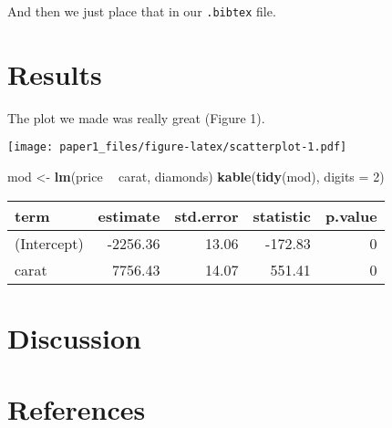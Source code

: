 \documentclass[
]{article}
\newenvironment{Shaded}{\begin{snugshade}}{\end{snugshade}}
\newcommand{\DataTypeTok}[1]{\textcolor[rgb]{0.13,0.29,0.53}{#1}}
\newcommand{\DecValTok}[1]{\textcolor[rgb]{0.00,0.00,0.81}{#1}}
\newcommand{\KeywordTok}[1]{\textcolor[rgb]{0.13,0.29,0.53}{\textbf{#1}}}
\newcommand{\NormalTok}[1]{#1}
\newcommand{\OperatorTok}[1]{\textcolor[rgb]{0.81,0.36,0.00}{\textbf{#1}}}
\newcommand{\StringTok}[1]{\textcolor[rgb]{0.31,0.60,0.02}{#1}}
\begin{document}
And then we just place that in our \texttt{.bibtex} file.

\hypertarget{results}{%
\section{Results}\label{results}}

The plot we made was really great (Figure 1).

\begin{Shaded}
\end{Shaded}

\texttt{[image: paper1\_files/figure-latex/scatterplot-1.pdf]}

\begin{Shaded}
\begin{Highlighting}[]
\NormalTok{mod <-}\StringTok{ }\KeywordTok{lm}\NormalTok{(price }\OperatorTok{~}\StringTok{ }\NormalTok{carat, diamonds)}
\KeywordTok{kable}\NormalTok{(}\KeywordTok{tidy}\NormalTok{(mod), }\DataTypeTok{digits =} \DecValTok{2}\NormalTok{)}
\end{Highlighting}
\end{Shaded}

\begin{longtable}[]{@{}lrrrr@{}}
\toprule
term & estimate & std.error & statistic & p.value\tabularnewline
\midrule
\endhead
(Intercept) & -2256.36 & 13.06 & -172.83 & 0\tabularnewline
carat & 7756.43 & 14.07 & 551.41 & 0\tabularnewline
\bottomrule
\end{longtable}

\hypertarget{discussion}{%
\section{Discussion}\label{discussion}}

\hypertarget{references}{%
\section*{References}\label{references}}
\end{document}
